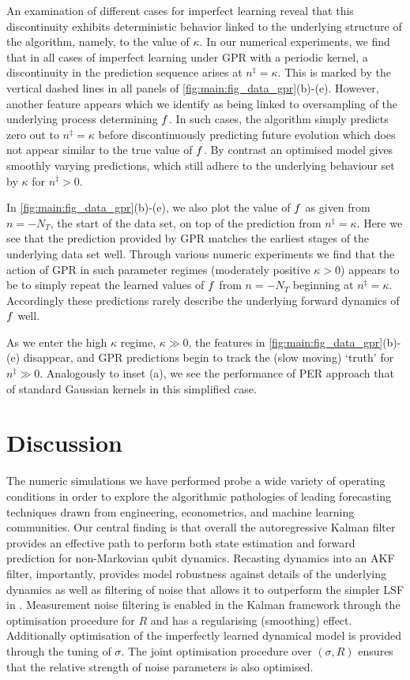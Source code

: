 An examination of different cases for imperfect learning reveal that this discontinuity exhibits deterministic behavior linked to the underlying structure of the algorithm, namely, to the value of $\kappa$. In our numerical experiments, we find that in all cases of imperfect learning under GPR with a periodic kernel, a discontinuity in the prediction sequence arises at  $n^\ddagger = \kappa$. This is marked by the vertical dashed lines in all panels of \cref{fig:main:fig_data_gpr}(b)-(e).  However, another feature appears which we identify as being linked to oversampling of the underlying process determining $f$.  In such cases, the algorithm simply predicts zero out to $n^\ddagger=\kappa$ before discontinuously predicting future evolution which does not appear similar to the true value of $f$.  By contrast an optimised model gives smoothly varying predictions, which still adhere to the underlying behaviour set by $\kappa$ for $n^\ddagger>0$. 

In \cref{fig:main:fig_data_gpr}(b)-(e), we also plot the value of $f$ as given from $n=-N_{T}$, the start of the data set, on top of the prediction from $n^\ddagger=\kappa$.  Here we see that the prediction provided by GPR matches the earliest stages of the underlying data set well.  Through various numeric experiments we find that the action of GPR in such parameter regimes (moderately positive $\kappa >0$) appears to be to simply repeat the learned values of $f$ from $n=-N_{T}$ beginning at $n^\ddagger=\kappa$.  Accordingly these predictions rarely describe the underlying forward dynamics of $f$ well. 

As we enter the high $\kappa$ regime,  $\kappa  \gg 0$, the features in \cref{fig:main:fig_data_gpr}(b)-(e) disappear, and GPR predictions begin to track the (slow moving) `truth' for $n^\ddagger \gg 0$. Analogously to inset (a), we see the performance of PER approach that of standard Gaussian kernels in this simplified case.



\section{Discussion} \label{sec:main:discussion}
The numeric simulations we have performed probe a wide variety of operating conditions in order to explore the algorithmic pathologies of leading forecasting techniques drawn from engineering, econometrics, and machine learning communities.  Our central finding is that overall the autoregressive Kalman filter provides an effective path to perform both state estimation and forward prediction for non-Markovian qubit dynamics. Recasting dynamics into an AKF filter, importantly, provides model robustness against details of the underlying dynamics as well as filtering of noise that allows it to outperform the simpler LSF in \cite{mavadia2017}.  Measurement noise filtering is enabled in the Kalman framework through the optimisation procedure for $R$ and has a regularising (smoothing) effect. Additionally optimisation of the imperfectly learned dynamical model is provided through the tuning of $\sigma$. The joint optimisation procedure over $(\sigma, R)$ ensures that the relative strength of noise parameters is also optimised.  

